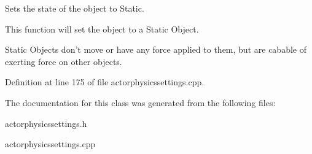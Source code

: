 Sets the state of the object to Static. 

This function will set the object to a Static Object. \par
 Static Objects don't move or have any force applied to them, but are cabable of exerting force on other objects. 

Definition at line 175 of file actorphysicssettings.cpp.



The documentation for this class was generated from the following files:\begin{DoxyCompactItemize}
\item 
actorphysicssettings.h\item 
actorphysicssettings.cpp\end{DoxyCompactItemize}
